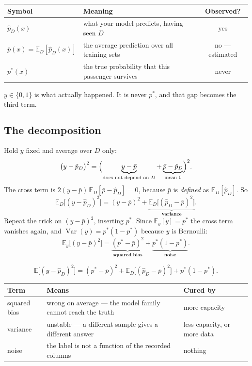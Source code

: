 \documentclass[11pt,a4paper]{article}
\begin{document}
\begin{center}
\small
\begin{tabular}{llc}
\toprule
\textbf{Symbol} & \textbf{Meaning} & \textbf{Observed?} \\
\midrule
$\hat p_D(x)$ & what your model predicts, having seen $D$ & yes \\
$\bar p(x) = \mathbb{E}_D[\hat p_D(x)]$ & the average prediction over all
                                          training sets & no --- estimated \\
$p^{*}(x)$ & the true probability that this passenger survives & never \\
\bottomrule
\end{tabular}
\end{center}

$y \in \{0,1\}$ is what actually happened. It is never $p^{*}$, and that gap
becomes the third term.

\subsection{The decomposition}

\begin{derivbox}[title={Add and subtract, twice}]
Hold $y$ fixed and average over $D$ only:
\[ \bigl(y - \hat p_D\bigr)^2 = \Bigl(
   \underbrace{y - \bar p}_{\text{does not depend on } D}
   + \underbrace{\bar p - \hat p_D}_{\text{mean } 0}\Bigr)^2. \]
The cross term is $2(y - \bar p)\,\mathbb{E}_D[\bar p - \hat p_D] = 0$, because
$\bar p$ is \emph{defined} as $\mathbb{E}_D[\hat p_D]$. So
\[ \mathbb{E}_D\bigl[(y - \hat p_D)^2\bigr]
   = (y - \bar p)^2
   + \underbrace{\mathbb{E}_D\bigl[(\hat p_D - \bar p)^2\bigr]}_{\textbf{variance}}. \]
Repeat the trick on $(y - \bar p)^2$, inserting $p^{*}$. Since
$\mathbb{E}_y[y] = p^{*}$ the cross term vanishes again, and
$\operatorname{Var}(y) = p^{*}(1-p^{*})$ because $y$ is Bernoulli:
\[ \mathbb{E}_y\bigl[(y-\bar p)^2\bigr]
   = \underbrace{(p^{*} - \bar p)^2}_{\textbf{squared bias}}
   + \underbrace{p^{*}(1-p^{*})}_{\textbf{noise}}. \]
\end{derivbox}

\[ \mathbb{E}\bigl[(y - \hat p_D)^2\bigr]
   = (p^{*} - \bar p)^2
   + \mathbb{E}_D\bigl[(\hat p_D - \bar p)^2\bigr]
   + p^{*}(1 - p^{*}). \]

\begin{center}
\small
\begin{tabular}{lp{}l}
\toprule
\textbf{Term} & \textbf{Means} & \textbf{Cured by} \\
\midrule
squared bias & wrong on average --- the model family cannot reach the truth &
               more capacity \\
variance     & unstable --- a different sample gives a different answer &
               less capacity, or more data \\
noise        & the label is not a function of the recorded columns & nothing \\
\bottomrule
\end{tabular}
\end{center}
\end{document}

